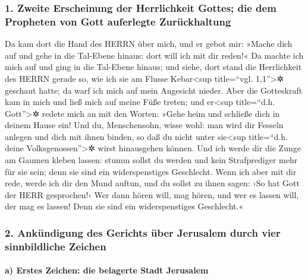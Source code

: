 \hypertarget{zweite-erscheinung-der-herrlichkeit-gottes-die-dem-propheten-von-gott-auferlegte-zuruxfcckhaltung}{%
\subsubsection{1. Zweite Erscheinung der Herrlichkeit Gottes; die dem
Propheten von Gott auferlegte
Zurückhaltung}\label{zweite-erscheinung-der-herrlichkeit-gottes-die-dem-propheten-von-gott-auferlegte-zuruxfcckhaltung}}

Da kam dort die Hand des HERRN über mich, und er gebot
mir: »Mache dich auf und gehe in die Tal-Ebene hinaus: dort will ich mit
dir reden!« Da machte ich mich auf und ging in die
Tal-Ebene hinaus; und siehe, dort stand die Herrlichkeit des HERRN
gerade so, wie ich sie am Flusse Kebar\textless sup title=``vgl.
1,1''\textgreater✲ geschaut hatte; da warf ich mich auf mein Angesicht
nieder. Aber die Gotteskraft kam in mich und ließ mich
auf meine Füße treten; und er\textless sup title=``d.h.
Gott''\textgreater✲ redete mich an mit den Worten: »Gehe heim und
schließe dich in deinem Hause ein! Und du, Menschensohn,
wisse wohl: man wird dir Fesseln anlegen und dich mit ihnen binden, so
daß du nicht unter sie\textless sup title=``d.h. deine
Volksgenossen''\textgreater✲ wirst hinausgehen können.
Und ich werde dir die Zunge am Gaumen kleben lassen:
stumm sollst du werden und kein Strafprediger mehr für sie sein; denn
sie sind ein widerspenstiges Geschlecht. Wenn ich aber
mit dir rede, werde ich dir den Mund auftun, und du sollst zu ihnen
sagen: ›So hat Gott der HERR gesprochen!‹ Wer dann hören will, mag
hören, und wer es lassen will, der mag es lassen! Denn sie sind ein
widerspenstiges Geschlecht.«

\hypertarget{ankuxfcndigung-des-gerichts-uxfcber-jerusalem-durch-vier-sinnbildliche-zeichen}{%
\subsubsection{2. Ankündigung des Gerichts über Jerusalem durch vier
sinnbildliche
Zeichen}\label{ankuxfcndigung-des-gerichts-uxfcber-jerusalem-durch-vier-sinnbildliche-zeichen}}

\hypertarget{a-erstes-zeichen-die-belagerte-stadt-jerusalem}{%
\paragraph{a) Erstes Zeichen: die belagerte Stadt
Jerusalem}\label{a-erstes-zeichen-die-belagerte-stadt-jerusalem}}

